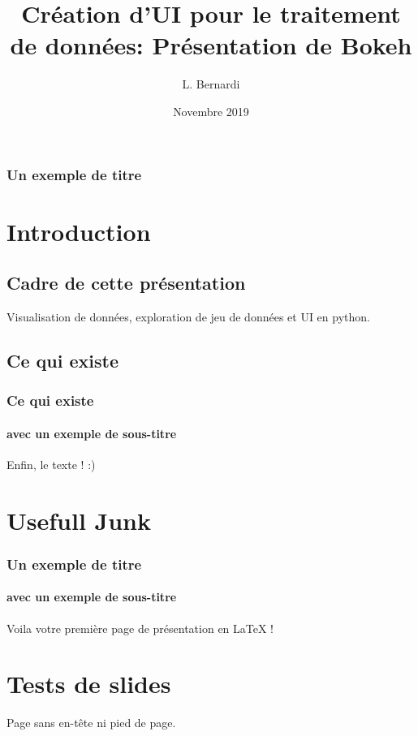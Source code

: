 \documentclass{beamer}
\title{Création d'UI pour le traitement de données: Présentation de Bokeh }
\author{L. Bernardi}
\institute{LLR }
\date{Novembre 2019}
\begin{document}
    \begin{frame}
        \titlepage
    \end{frame}

    \begin{frame}
                \frametitle{Un exemple de titre}

        \tableofcontents
    \end{frame}

    \section{Introduction}
    \subsection{Cadre de cette présentation}

    \begin{frame}
        Visualisation de données, exploration de jeu de données et UI en python.
    \end{frame}

    \subsection{Ce qui existe}
    \begin{frame}
        \frametitle{Ce qui existe}
        \framesubtitle{avec un exemple de sous-titre}
        Enfin, le texte ! :)
    \end{frame}



    \section{Usefull Junk}
    \begin{frame}
        \frametitle{Un exemple de titre}
        \framesubtitle{avec un exemple de sous-titre}

        Voila votre première page de présentation en LaTeX !
    \end{frame}

    \section{Tests de slides}

    \begin{frame}[plain]
        Page sans en-tête ni pied de page.
    \end{frame}
\end{document}
